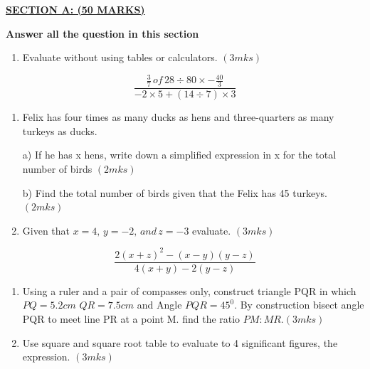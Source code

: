 \documentclass[
  a4paperpaper,
]{scrbook}
\providecommand{\tightlist}{%
  \setlength{\itemsep}{0pt}\setlength{\parskip}{0pt}}\usepackage{longtable,booktabs,array}
\begin{document}
\begin{tcolorbox}[enhanced jigsaw, left=2mm, colframe=quarto-callout-note-color-frame, toptitle=1mm, opacitybacktitle=0.6, rightrule=.15mm, colbacktitle=quarto-callout-note-color!10!white, colback=white, arc=.35mm, breakable, leftrule=.75mm, bottomtitle=1mm, bottomrule=.15mm, title=\textcolor{quarto-callout-note-color}{\faInfo}\hspace{0.5em}{Model Sample Paper 1}, titlerule=0mm, coltitle=black, toprule=.15mm, opacityback=0]

\ul{\textbf{SECTION A: (50 MARKS)}}

\textbf{Answer all the question in this section}

\begin{enumerate}
\def\labelenumi{\arabic{enumi}.}
\tightlist
\item
  Evaluate without using tables or calculators. \((3mks)\)
\end{enumerate}

\[ \frac{\frac{3}{7}\,of\,28\div80\times-\frac{40}{3}}{-2\times5+(14\div7)\times3}\]

\begin{enumerate}
\def\labelenumi{\arabic{enumi}.}
\setcounter{enumi}{1}
\item
  Felix has four times as many ducks as hens and three-quarters as many
  turkeys as ducks.

  a) If he has x hens, write down a simplified expression in x for the
  total number of birds \((2mks)\)

  b) Find the total number of birds given that the Felix has 45
  turkeys.\((2mks)\)
\item
  Given that \(x=4,\, y= -2,\, and \,z= -3\) evaluate. \((3mks)\)
\end{enumerate}

\[ \frac{2(x+z)^2-(x-y)(y-z)}{4(x+y)-2(y-z)}\]

\begin{enumerate}
\def\labelenumi{\arabic{enumi}.}
\setcounter{enumi}{3}
\item
  Using a ruler and a pair of compasses only, construct triangle PQR in
  which \(PQ = 5.2cm\) \(QR=7.5cm\) and Angle \(PQR = 45^0\). By
  construction bisect angle PQR to meet line PR at a point M. find the
  ratio \(PM:MR\).\((3mks)\)
\item
  Use square and square root table to evaluate to 4 significant figures,
  the expression. \((3mks)\)
\end{enumerate}


\end{tcolorbox}
\end{document}
